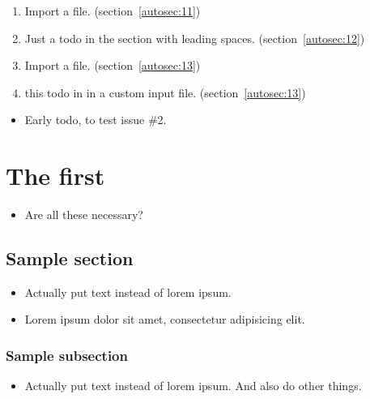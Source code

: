 \begin{enumerate}[noitemsep]
        \item {\color{red}Import a file.} (section~\ref{autosec:11})
        \item {\color{red}Just a todo in the section with leading spaces.} (section~\ref{autosec:12})
        \item {\color{red}Import a file.} (section~\ref{autosec:13})
        \item {\color{red}this todo in in a custom input file.} (section~\ref{autosec:13})
    \end{enumerate}

    \begin{itemize}[noitemsep]
        \item {\color{red}Early todo, to test issue \#2.}
    \end{itemize}
\chapter{The first}
\label{autosec:0}
    \begin{itemize}[noitemsep]
        \item {\color{ForestGreen}Are all these necessary?}
    \end{itemize}
\section{Sample section}
\label{autosec:1}
    \begin{itemize}[noitemsep]
        \item {\color{red}Actually put text instead of lorem ipsum.}
        \item Lorem ipsum dolor sit amet, consectetur adipisicing elit.
    \end{itemize}
\subsection{Sample subsection}
\label{autosec:2}
    \begin{itemize}[noitemsep]
        \item {\color{red}Actually put text instead of lorem ipsum.}
{\color{red}And also do other things.}
    \end{itemize}
